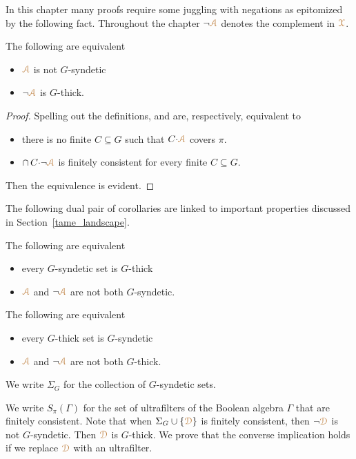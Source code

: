 In this chapter many proofs require some juggling with negations as epitomized by the following fact.
Throughout the chapter \emph{$\neg{\color{brown}\EuScript A}$\/} denotes the complement in ${\color{brown}\EuScript X}$.

\begin{fact}\label{fact_fip}
  The following are equivalent
  \begin{itemize}
    \item[1.] ${\color{brown}\EuScript A}$ is not $G$-syndetic
    \item[2.] $\neg{\color{brown}\EuScript A}$ is $G$-thick.
  \end{itemize}\smallskip
\end{fact}

\begin{proof}
  Spelling out the definitions,  and  are, respectively, equivalent to
  \begin{itemize}
    \item[1$'$.] there is no finite $C\subseteq G$ such that $C{\cdot}{\color{brown}\EuScript A}$ covers $\pi$.
    \item[2$'$.] $\cap\, C{\cdot}\neg{\color{brown}\EuScript A}$ is finitely consistent for every finite $C\subseteq G$.
  \end{itemize} 
  Then the equivalence is evident.
\end{proof}

The following dual pair of corollaries are linked to important properties discussed in Section~\ref{tame_landscape}.

\begin{corollary}
  The following are equivalent
  \begin{itemize}
    \item [1.] every $G$-syndetic set is $G$-thick
    \item [2.] ${\color{brown}\EuScript A}$ and $\neg{\color{brown}\EuScript A}$ are not both $G$-syndetic.
  \end{itemize}
\end{corollary}

\begin{corollary}
  The following are equivalent
  \begin{itemize}
    \item [1.] every $G$-thick set is $G$-syndetic
    \item [2.] ${\color{brown}\EuScript A}$ and $\neg{\color{brown}\EuScript A}$ are not both $G$-thick.
  \end{itemize}
\end{corollary}

We write \emph{$\Sigma_G$\/} for the collection of $G$-syndetic sets.

We write \emph{$S_\pi(\Gamma)$\/} for the set of ultrafilters of the Boolean algebra $\Gamma$ that are finitely consistent.
Note that when $\Sigma_G\cup\{{\color{brown}\EuScript D}\}$ is finitely consistent, then $\neg{\color{brown}\EuScript D}$ is not $G$-syndetic.
Then ${\color{brown}\EuScript D}$ is $G$-thick.
We prove that the converse implication holds if we replace ${\color{brown}\EuScript D}$ with an ultrafilter.

